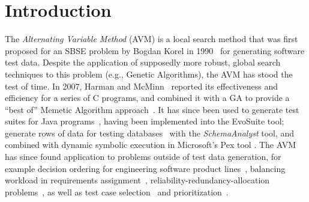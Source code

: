 \documentclass{llncs}
\newcommand{\AVM}{Alternating Variable Method\xspace}
\begin{document}
\section{Introduction}
\vspace{-1ex}
The {\it \AVM} (AVM) is a local search method that was first proposed for an SBSE problem by Bogdan Korel in 1990~\cite{Korel1990}
for generating software test data.
Despite the application of supposedly more robust, global search techniques to this problem (e.g., Genetic Algorithms), the AVM has stood the test of time. In 2007, Harman and McMinn~\cite{Harman2007} reported its effectiveness and efficiency for a series of C programs, and combined it with a GA to provide a ``best of'' Memetic Algorithm approach~\cite{Harman2010}. It has since been used to generate test suites for Java programs~\cite{%
Fraser2015b}, having been implemented into the {\sc EvoSuite} tool; generate rows of data for testing databases~\cite{Kapfhammer2013,McMinn2015} with the {\it SchemaAnalyst} tool, and combined with dynamic symbolic execution in Microsoft's Pex tool \cite{Lakhotia2010}.
The AVM has since found application to problems outside of test data generation, for example
%
decision ordering for engineering software product lines~\cite{Yue2016}, %
%
balancing workload in requirements assignment~\cite{Yue2014}, %
%
reliability-redundancy-allocation problems~\cite{Qiu2016}, %
%
as well as test case selection~\cite{Pradhan2016} and prioritization~\cite{Arrieta2016}. %
\end{document}
